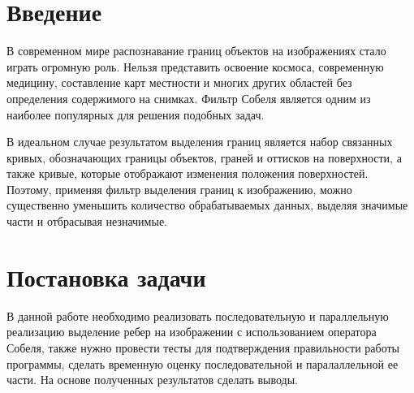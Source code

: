 \documentclass{report}
\begin{document}
	\setcounter{page}{2}

	\tableofcontents
	\newpage

	\section*{Введение}
	В современном мире распознавание границ объектов на изображениях стало играть огромную роль. Нельзя представить освоение космоса, современную медицину, составление карт местности и многих других областей без определения содержимого на снимках.  Фильтр Собеля является одним из наиболее популярных для решения подобных задач.
	\par В идеальном случае результатом выделения границ является набор связанных кривых, обозначающих границы объектов, граней и оттисков на поверхности, а также кривые, которые отображают изменения положения поверхностей. Поэтому, применяя фильтр выделения границ к изображению, можно существенно уменьшить количество обрабатываемых данных, выделяя значимые части и отбрасывая незначимые.
	\newpage

	\section*{Постановка задачи}
	В данной работе необходимо реализовать последовательную и параллельную реализацию выделение ребер на изображении с использованием оператора Собеля, также нужно провести тесты для подтверждения правильности работы программы, сделать временную оценку последовательной и паралаллельной ее части. На основе полученных результатов сделать выводы.
	\newpage

\end{document}
